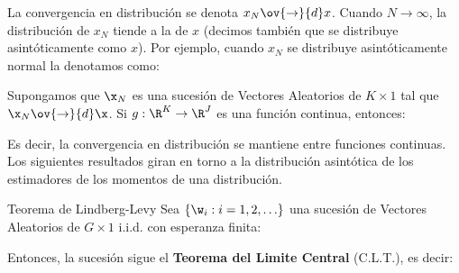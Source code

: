\bigskip
{}

\bigskip
La convergencia en distribución se denota $x_N\ov{\to}{d}x$. Cuando $N\to\infty$, la distribución de $x_N$ tiende a la de $x$ (decimos también que se distribuye asintóticamente como $x$). Por ejemplo, cuando $x_N$ se distribuye asintóticamente normal la denotamos como:

\bigskip
Supongamos que $\x_N$ es una sucesión de Vectores Aleatorios de $K\times 1$ tal que $\x_N\ov{\to}{d}\x$. Si $g:\R^K\to\R^J$ es una función continua, entonces:

Es decir, la convergencia en distribución se mantiene entre funciones continuas. Los siguientes resultados giran en torno a la distribución asintótica de los estimadores de los momentos de una distribución.\\

\bigskip

\begin{teorema}{Teorema de Lindberg-Levy}
Sea $\lbrace \w_i:i=1,2,\hdots \rbrace$ una sucesión de Vectores Aleatorios de $G\times 1$ i.i.d. con esperanza finita:

\bigskip
Entonces, la sucesión sigue el \textbf{Teorema del Limite Central} (C.L.T.), es decir:
\end{teorema}

